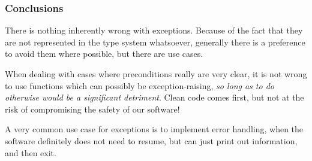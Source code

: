 \documentclass[aspectratio=169, handout]{beamer}
\begin{document}
\begin{frame}[fragile]
  \frametitle{Conclusions}

  There is nothing inherently wrong with exceptions. Because of the fact that
  they are not represented in the type system whatsoever, generally there is a
  preference to avoid them where possible, but there are use cases.

  \pause
  \vspace{\fill}

  When dealing with cases where preconditions really are very clear, it is not
  wrong to use functions which can possibly be exception-raising, \textit{so
  long as to do otherwise would be a significant detriment}. Clean code comes
  first, but not at the risk of compromising the safety of our software!

  \pause
  \vspace{\fill}

  A very common use case for exceptions is to implement error handling, when
  the software definitely does not need to resume, but can just print out
  information, and then exit.
\end{frame}




\thankyou
\end{document}
